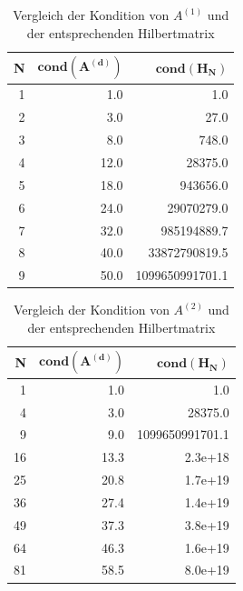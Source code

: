 \documentclass{scrartcl}
\begin{document}
\begin{table}[ht!]
\centering
\begin{tabular}{|r|r|r|}
\hline
\textbf{N} & $\mathbf{cond(A^{(d)})}$ & $\mathbf{cond(H_N)}$   \\ \hline
1          & 1.0                       & 1.0                \\ \hline
2          & 3.0                       & 27.0               \\ \hline
3          & 8.0                       & 748.0              \\ \hline
4          & 12.0                      & 28375.0            \\ \hline
5          & 18.0                      & 943656.0          \\ \hline
6          & 24.0                      & 29070279.0         \\ \hline
7          & 32.0                      & 985194889.7        \\ \hline
8          & 40.0                      & 33872790819.5      \\ \hline
9          & 50.0                      & 1099650991701.1    \\ \hline
\end{tabular}
\caption{Vergleich der Kondition von $A^{(1)}$ und der entsprechenden Hilbertmatrix}
\end{table}

\begin{table}[ht!]
\centering
\begin{tabular}{|r|r|r|}
\hline
\textbf{N} & $\mathbf{cond(A^{(d)})}$  & $\mathbf{cond(H_N)}$       \\ \hline
1          & 1.0                       & 1.0                    \\ \hline
4          & 3.0                       & 28375.0                \\ \hline
9          & 9.0                       & 1099650991701.1        \\ \hline
16         & 13.3                      & 2.3e+18             \\ \hline
25         & 20.8                      & 1.7e+19 \\ \hline
36         & 27.4                      & 1.4e+19  \\ \hline
49         & 37.3                      & 3.8e+19  \\ \hline
64         & 46.3                      & 1.6e+19 \\ \hline
81         & 58.5                      & 8.0e+19  \\ \hline
\end{tabular}
\caption{Vergleich der Kondition von $A^{(2)}$ und der entsprechenden Hilbertmatrix}
\end{table}
\end{document}
